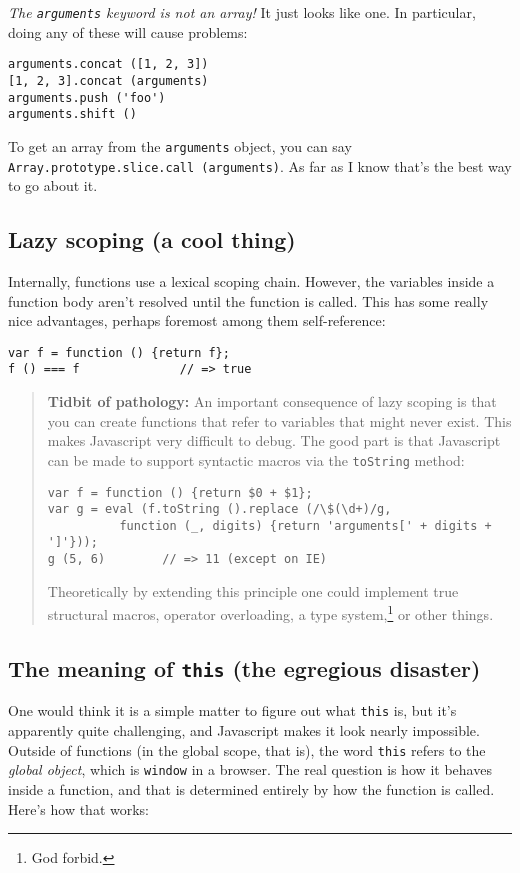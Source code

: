 \documentclass{article}
\begin{document}
    {\it The {\tt arguments} keyword is not an array!} It just looks like one. In particular, doing any of these will cause problems:

\begin{verbatim}
arguments.concat ([1, 2, 3])
[1, 2, 3].concat (arguments)
arguments.push ('foo')
arguments.shift ()
\end{verbatim}

    To get an array from the \verb|arguments| object, you can say \verb|Array.prototype.slice.call (arguments)|. As far as I know that's the best way to go about it.

\subsection {Lazy scoping (a cool thing)}
    Internally, functions use a lexical scoping chain. However, the variables inside a function body aren't resolved until the function is called. This has some really nice advantages,
    perhaps foremost among them self-reference:

\begin{verbatim}
var f = function () {return f};
f () === f              // => true
\end{verbatim}

    \begin{quote}
      {\bf Tidbit of pathology:} An important consequence of lazy scoping is that you can create functions that refer to variables that might never exist. This makes Javascript very difficult
      to debug. The good part is that Javascript can be made to support syntactic macros via the \verb|toString| method:

\begin{verbatim}
var f = function () {return $0 + $1};
var g = eval (f.toString ().replace (/\$(\d+)/g,
          function (_, digits) {return 'arguments[' + digits + ']'}));
g (5, 6)        // => 11 (except on IE)
\end{verbatim}

      Theoretically by extending this principle one could implement true structural macros, operator overloading, a type system,\footnote{God forbid.} or other things.
    \end{quote}

\subsection {The meaning of {\tt this} (the egregious disaster)}
    One would think it is a simple matter to figure out what \verb|this| is, but it's apparently quite challenging, and Javascript makes it look nearly impossible. Outside of functions (in
    the global scope, that is), the word \verb|this| refers to the {\it global object}, which is \verb|window| in a browser. The real question is how it behaves inside a function, and that
    is determined entirely by how the function is called. Here's how that works:
\end{document}
